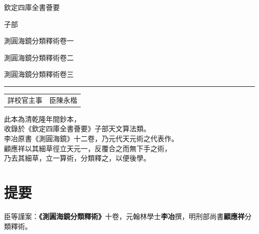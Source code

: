 \documentclass[11pt,a4paper]{article}
\newcommand{\shortline}{\noindent\rule{0.5\textwidth}{0.4pt}\par}
\begin{document}
\thispagestyle{empty}
\begin{center}
\vspace*{3cm}
{\LARGE 欽定四庫全書薈要}

\vspace{1.5cm}
{\Large 子部}

\vspace{2cm}
{\Large 測圓海鏡分類釋術卷一}

\vspace{0.5cm}
{\Large 測圓海鏡分類釋術卷二}

\vspace{0.5cm}
{\Large 測圓海鏡分類釋術卷三}

\vspace{2cm}
\shortline

\vspace{1cm}
{\normalsize
\begin{tabular}{ll}
詳校官主事 & 臣陳永楷 \\
\end{tabular}
}

\vspace{3cm}
{\small\textcolor{notecolor}{%
此本為清乾隆年間鈔本，\\
收錄於《欽定四庫全書薈要》子部天文算法類。\\[0.5em]
李冶原書《測圓海鏡》十二卷，乃元代天元術之代表作。\\
顧應祥以其細草徑立天元一，反覆合之而無下手之術，\\
乃去其細草，立一算術，分類釋之，以便後學。
}}

\end{center}
\clearpage

\tableofcontents
\clearpage

\section*{提要}

臣等謹案：\textbf{《測圓海鏡分類釋術》}十卷，元翰林學士\textbf{李冶}撰，明刑部尚書\textbf{顧應祥}分類釋術。
\end{document}
